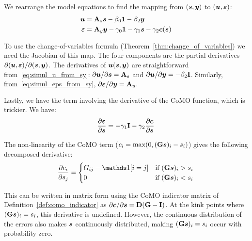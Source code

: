 We rearrange the model equations to find the mapping from $(\bm{s}, \bm{y})$ to $(\bm{u}, \bm{\varepsilon})$:
\begin{align}
\label{eq:simul_u_from_sy}
    \bm{u} &= \mathbf{A}_s\bm{s} - \beta_0\bm{1} - \beta_2\bm{y} \\
\label{eq:simul_eps_from_sy}
    \bm{\varepsilon} &= \mathbf{A}_y\bm{y} - \gamma_0\bm{1} - \gamma_1\bm{s} - \gamma_2\bm{c}(\bm{s})
\end{align}

To use the change-of-variables formula (Theorem~\ref{thm:change_of_variables}) we need the Jacobian of this map. The four components are the partial derivatives $\partial(\bm{u}, \bm{\varepsilon}) / \partial(\bm{s}, \bm{y})$. The derivatives of $\bm{u}(\bm{s}, \bm{y})$ are straightforward from~\eqref{eq:simul_u_from_sy}: $\partial\bm{u}/\partial\bm{s} = \mathbf{A}_s$ and $\partial\bm{u}/\partial\bm{y} = -\beta_2\mathbf{I}$. Similarly, from~\eqref{eq:simul_eps_from_sy}, $\partial\bm{\varepsilon}/\partial\bm{y} = \mathbf{A}_y$.

Lastly, we have the term involving the derivative of the CoMO function, which is trickier. We have:
\begin{equation}
    \frac{\partial\bm{\varepsilon}}{\partial\bm{s}} = -\gamma_1\mathbf{I} - \gamma_2\frac{\partial\bm{c}}{\partial\bm{s}}
\end{equation}

The non-linearity of the CoMO term ($c_i = \max(0, (\mathbf{G}\bm{s})_i - s_i)$) gives the following decomposed derivative:
\begin{equation}
    \frac{\partial c_i}{\partial s_j} = \begin{cases}
        G_{ij} - \one[i = j] & \text{if } (\mat{G}\vect{s})_i > s_i \\
        0 & \text{if } (\mat{G}\vect{s})_i < s_i
    \end{cases}
\end{equation}

This can be written in matrix form using the CoMO indicator matrix of Definition~\ref{def:como_indicator} as $\partial\bm{c}/\partial\bm{s} = \mathbf{D}(\mathbf{G} - \mathbf{I})$. At the kink points where $(\mathbf{G}\bm{s})_i = s_i$, this derivative is undefined. However, the continuous distribution of the errors also makes $\bm{s}$ continuously distributed, making $(\mathbf{G}\bm{s})_i = s_i$ occur with probability zero.

